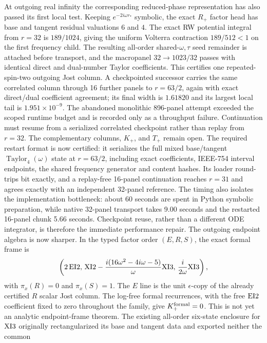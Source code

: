 \documentclass[11pt]{article}
\theoremstyle{definition}
\theoremstyle{remark}
\begin{document}
At outgoing real infinity the corresponding reduced-phase representation
has also passed its first local test.  Keeping \(e^{-2i\omega r_*}\)
symbolic, the exact \(R_+\) factor head has base and tangent residual
valuations \(6\) and \(4\).  The exact RW potential integral from \(r=32\)
is \(189/1024\), giving the uniform Volterra contraction
\(189/512<1\) on the first frequency child.  The resulting all-order
shared-\(\omega,\tau\) seed remainder is attached before transport, and the
macropanel \(32\to1023/32\) passes with identical direct and dual-number
Taylor coefficients.  This certifies one repeated-spin-two outgoing Jost
column.  A checkpointed successor carries the same correlated column through
16 further panels to \(r=63/2\), again with exact direct/dual coefficient
agreement; its final width is \(1.61820\) and its largest local tail is
\(1.951\times10^{-9}\).  The abandoned monolithic 896-panel attempt exceeded
the scoped runtime budget and is recorded only as a throughput failure.
Continuation must resume from a serialized correlated checkpoint rather than
replay from \(r=32\).  The complementary columns, \(K_+\), and \(T_+\) remain
open.  The required restart format is now certified: it serializes the full
mixed base/tangent \(\operatorname{Taylor}_4(\omega)\) state at \(r=63/2\),
including exact coefficients, IEEE-754 interval endpoints, the shared
frequency generator and content hashes.  Its loader round-trips bit exactly,
and a replay-free 16-panel continuation reaches \(r=31\) and agrees exactly
with an independent 32-panel reference.  The timing also isolates the
implementation bottleneck: about 60 seconds are spent in Python symbolic
preparation, while native 32-panel transport takes 9.00 seconds and the
restarted 16-panel chunk 5.66 seconds.  Checkpoint reuse, rather than a
different ODE integrator, is therefore the immediate performance repair.
The outgoing endpoint algebra is now sharper.  In the typed factor order
\((E,R,S)\), the exact formal frame is
\[
 \left(
 2\,{\rm EI2},\,
 {\rm XI2}-\frac{i(16\omega^2-4i\omega-5)}{\omega}{\rm XI3},\,
 \frac{i}{2\omega}{\rm XI3}
 \right),
\]
with \(\pi_x(R)=0\) and \(\pi_x(S)=1\).  The \(E\) line is the unit
\(\epsilon\)-copy of the already certified \(R\) scalar Jost column.
The log-free formal recurrences, with the free \({\rm EI2}\) coefficient
fixed to zero throughout the family, give
\(K_+^{\rm formal}=0\).  This is not yet an analytic endpoint-frame theorem.
The existing all-order six-state enclosure for \({\rm XI3}\) originally
rectangularized its base and tangent data and exported neither the common
\end{document}
